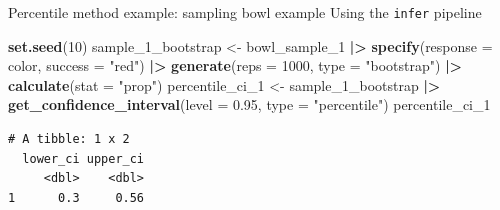 \documentclass[
  ignorenonframetext,
]{beamer}
\newenvironment{Shaded}{\begin{snugshade}}{\end{snugshade}}
\newcommand{\AttributeTok}[1]{\textcolor[rgb]{0.13,0.29,0.53}{#1}}
\newcommand{\DecValTok}[1]{\textcolor[rgb]{0.00,0.00,0.81}{#1}}
\newcommand{\FloatTok}[1]{\textcolor[rgb]{0.00,0.00,0.81}{#1}}
\newcommand{\FunctionTok}[1]{\textcolor[rgb]{0.13,0.29,0.53}{\textbf{#1}}}
\newcommand{\NormalTok}[1]{#1}
\newcommand{\OtherTok}[1]{\textcolor[rgb]{0.56,0.35,0.01}{#1}}
\newcommand{\SpecialCharTok}[1]{\textcolor[rgb]{0.81,0.36,0.00}{\textbf{#1}}}
\newcommand{\StringTok}[1]{\textcolor[rgb]{0.31,0.60,0.02}{#1}}
\begin{document}
\begin{frame}[fragile]{Percentile method example: sampling bowl example}
\protect\hypertarget{percentile-method-example-sampling-bowl-example}{}
Using the \texttt{infer} pipeline

\begin{Shaded}
\begin{Highlighting}[]
\FunctionTok{set.seed}\NormalTok{(}\DecValTok{10}\NormalTok{)}
\NormalTok{sample\_1\_bootstrap }\OtherTok{\textless{}{-}}\NormalTok{ bowl\_sample\_1 }\SpecialCharTok{|\textgreater{}} 
  \FunctionTok{specify}\NormalTok{(}\AttributeTok{response =}\NormalTok{ color, }\AttributeTok{success =} \StringTok{"red"}\NormalTok{) }\SpecialCharTok{|\textgreater{}} 
  \FunctionTok{generate}\NormalTok{(}\AttributeTok{reps =} \DecValTok{1000}\NormalTok{, }\AttributeTok{type =} \StringTok{"bootstrap"}\NormalTok{) }\SpecialCharTok{|\textgreater{}} 
  \FunctionTok{calculate}\NormalTok{(}\AttributeTok{stat =} \StringTok{"prop"}\NormalTok{)}
\NormalTok{percentile\_ci\_1 }\OtherTok{\textless{}{-}}\NormalTok{ sample\_1\_bootstrap }\SpecialCharTok{|\textgreater{}} 
  \FunctionTok{get\_confidence\_interval}\NormalTok{(}\AttributeTok{level =} \FloatTok{0.95}\NormalTok{, }\AttributeTok{type =} \StringTok{"percentile"}\NormalTok{)}
\NormalTok{percentile\_ci\_1}
\end{Highlighting}
\end{Shaded}

\begin{verbatim}
# A tibble: 1 x 2
  lower_ci upper_ci
     <dbl>    <dbl>
1      0.3     0.56
\end{verbatim}
\end{frame}
\end{document}
